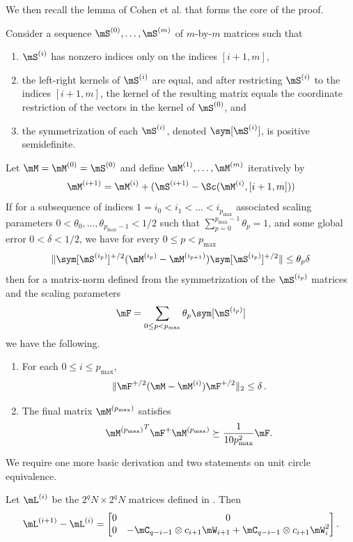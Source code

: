 \documentclass{toc}
\begin{document}
\noindent
We then recall the lemma of Cohen et al. \cite{CKKPPRS18} %
that forms the core of the 
proof. %
%
%
%
\begin{lemma}  %
\label{app:sc}
  Consider a sequence
%
%
$\mS^{(0)},\ldots,\mS^{(m)}$
of $m$-by-$m$ matrices %
such that  %
%
%
%
\begin{enumerate}
    \item $\mS^{(i)}$ has nonzero indices only on the indices $[i+1,m]$,
    \item the left-right kernels of $\mS^{(i)}$ are equal, and after restricting $\mS^{(i)}$ to the indices $[i+1,m]$, the kernel of the resulting matrix equals the coordinate restriction of the vectors in the kernel of $\mS^{(0)}$, and  %
    \item the symmetrization of each $\mS^{(i)}$, denoted $\sym[\mS^{(i)}]$, is positive
%
semidefinite.  %
\end{enumerate}
Let $\mM=\mM^{(0)}=\mS^{(0)}$ and define $\mM^{(1)},\ldots, \mM^{(m)}$ iteratively by
$$\mM^{(i+1)} = \mM^{(i)} + (\mS^{(i+1)} - \Sc(\mM^{(i)},[i+1,m]))$$
If for a subsequence of indices $1 =i_0<i_1<\ldots<  i_{p_{\max}}$ associated scaling parameters $0< \theta_0,\ldots,\theta_{p_{\max}-1}<1/2$ such that $\sum_{p=0}^{p_{\max}-1}\theta_p=1$, and some global error $0< \delta <1/2$, we have for 
every $0\leq p < p_{\max}$ %
$$\|\sym[\mS^{(i_p)}]^{+/2}(\mM^{(i_p)}-\mM^{(i_{p+1})})\sym[\mS^{(i_p)}]^{+/2}\| \leq \theta_p\delta$$
then for a matrix-norm defined from the symmetrization of the $\mS^{(i_p)}$ matrices and the scaling parameters
$$\mF = \sum_{0\leq p<p_{\max}}\theta_p \sym[\mS^{(i_p)}]$$
we have the following.  %
\begin{enumerate}
    \item For each $0\leq i\leq p_{\max}$,
    $$\|\mF^{+/2}(\mM-\mM^{(i)})\mF^{+/2}\|_2 \leq \delta\,.$$
    \item The final matrix $\mM^{(p_{\max})}$ satisfies
    $${\mM^{(p_{\max})}}^T\mF^+\mM^{(p_{\max})}\succeq \frac{1}{10p^2_{\max}}\mF.$$
\end{enumerate}
\end{lemma}

We require one more basic derivation and two statements on unit circle equivalence.
%
\begin{lemma} %
\label{app:diff}
Let $\mL^{(i)}$ be the $2^qN\times 2^qN$ matrices defined in  . Then
$$\mL^{(i+1)}-\mL^{(i)} = \begin{bmatrix} 0 & 0\\ 0 & -\mC_{q-i-1}\otimes c_{i+1}\mW_{i+1}+\mC_{q-i-1}\otimes c_{i+1}\mW_{i}^2\end{bmatrix}.$$
\end{lemma}
\end{document}
